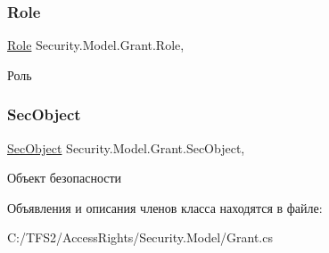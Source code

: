 \subsubsection{\texorpdfstring{Role}{Role}}
{\footnotesize\ttfamily \hyperlink{class_security_1_1_model_1_1_role}{Role} Security.\+Model.\+Grant.\+Role\hspace{0.3cm}{\ttfamily [get]}, {\ttfamily [set]}}



Роль 

\mbox{\label{class_security_1_1_model_1_1_grant_a85da2537c795eff5c994fa095e6b6706}} 
\subsubsection{\texorpdfstring{Sec\+Object}{SecObject}}
{\footnotesize\ttfamily \hyperlink{class_security_1_1_model_1_1_sec_object}{Sec\+Object} Security.\+Model.\+Grant.\+Sec\+Object\hspace{0.3cm}{\ttfamily [get]}, {\ttfamily [set]}}



Объект безопасности 



Объявления и описания членов класса находятся в файле\+:\begin{DoxyCompactItemize}
\item 
C\+:/\+T\+F\+S2/\+Access\+Rights/\+Security.\+Model/Grant.\+cs\end{DoxyCompactItemize}
